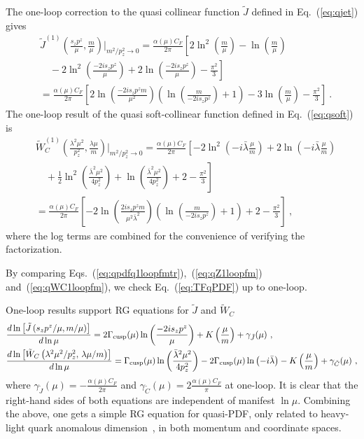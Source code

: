 \documentclass[a4paper,11pt]{article}
\begin{document}
The one-loop correction to the quasi collinear function $\tilde{J}$ defined in Eq.~(\ref{eq:qjet}) gives
\begin{align}\label{eq:qZ1loopfm}
&\tilde{J}^{(1)}\left(\frac{s_{z} p^z}{\mu}, \frac{m}{\mu}\right) \bigg|_{m^2/p_z^2 \rightarrow 0} =  \frac{\alpha(\mu) C_F}{2\pi} \left[ 2 \ln^2\left(\frac{m}{\mu}\right) - \ln\left(\frac{m}{\mu}\right) \right. \nonumber\\
&\left.\quad -2 \ln^2\left(\frac{- 2 i s_{z} p^z }{\mu}\right) + 2 \ln\left(\frac{-2 i s_{z} p^z }{\mu}\right) - \frac{\pi^2}{3} \right]  \nonumber\\
&= \frac{\alpha(\mu) C_F}{2\pi} \left[  2 \ln\left(\frac{-2 i s_z p^z m}{\mu^2}\right) \left(\ln\left(\frac{m}{-2 i s_z p^z}\right)+1\right) - 3 \ln\left(\frac{m}{\mu}\right) - \frac{\pi^2}{3}\right] \ .
\end{align}
The one-loop result of the quasi soft-collinear function defined in Eq.~(\ref{eq:qsoft}) is
\begin{align}\label{eq:qWC1loopfm}
&\tilde W_C^{(1)}\left(\frac{\lambda^2 \mu^2}{p_z^2}, \frac{\lambda \mu}{m}\right) \bigg|_{m^2/p_z^2 \rightarrow 0} = \frac{\alpha(\mu) C_F}{2\pi} \left[ - 2 \ln^2\left(-i \bar{\lambda}  \frac{\mu}{m}\right) + 2 \ln\left(-i \bar{\lambda} \frac{\mu}{m} \right) \right.\nonumber\\
&\left.\quad  + \frac{1}{2}\ln^2\left(\frac{\bar{\lambda}^2 \mu^2}{4 p_z^2}\right) + \ln\left(\frac{\bar{\lambda}^2 \mu^2}{4 p_z^2}\right) + 2 -\frac{\pi^2}{3}  \right] \nonumber\\
&= \frac{\alpha(\mu) C_F}{2\pi} \left[ -2 \ln\left(\frac{2 i s_z p^z m}{\mu^2 \bar{\lambda}^2}\right) \left( \ln\left(\frac{m}{-2 i s_z p^z}\right) + 1 \right) + 2 - \frac{\pi^2}{3}\right] \ ,
\end{align}
where the log terms are combined for the convenience of verifying the factorization.

By comparing Eqs.~(\ref{eq:qpdfq1loopfmtr}),~(\ref{eq:qZ1loopfm}) and~(\ref{eq:qWC1loopfm}), we check Eq.~(\ref{eq:TFqPDF}) up to one-loop. 

One-loop results support RG equations for $\tilde{J}$ and $\tilde{W}_C$ 
\begin{align}
&\frac{d \ln\left[\tilde{J}\left( s_z p^z/\mu, m/\mu \right)\right]}{d \ln \mu} 
= 2 \Gamma_{\rm cusp}(\mu) \ln\left(\frac{-2 i s_z p^z}{\mu}\right) +  K\left(\frac{\mu}{m}\right) + \gamma_{\tilde{J}}(\mu) \ , \\
& \frac{d\ln \left[\tilde W_C\left( \lambda^2 \mu^2/p_z^2, \, \lambda \mu/m \right)\right]}{d\ln \mu} 
=  \Gamma_{\rm cusp}(\mu) \ln\left(\frac{
\bar{\lambda}^2\mu^2}{4p_z^2}\right) - 2 \Gamma_{\rm cusp}(\mu) \ln\left(-i \bar{\lambda} \right) -  K\left(\frac{\mu}{m}\right) + 
 \gamma_{\tilde{C}}(\mu) \ , 
\end{align}
where $\gamma_{\tilde{J}}(\mu) = -\frac{\alpha(\mu) C_F}{2\pi}$ and $\gamma_{\tilde{C}}(\mu) = 2\frac{\alpha(\mu) C_F}{\pi}$ at one-loop. It is clear that the right-hand sides of both equations are independent of manifest $\ln \mu$. Combining the above, one gets a simple RG equation for quasi-PDF, only related to heavy-light quark anomalous dimension~\cite{Ji:1991pr, Chetyrkin:2003vi, Braun:2020ymy, Grozin:2023dlk}, in both momentum and 
coordinate spaces. 
\end{document}
